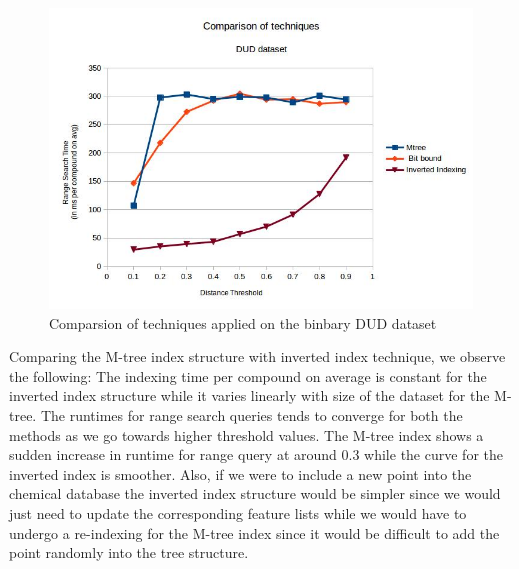 \begin{figure}[ht!]	
\centering
\includegraphics[width=0.75 \columnwidth]{img/imageC3.jpg}
\caption{Comparsion of techniques applied on the binbary DUD dataset}
\label{fig:5C3}
\end{figure}

Comparing the M-tree index structure with inverted index technique, we observe the following: The indexing time  per compound on average is constant for the inverted index structure while it varies linearly with size of the dataset for the M-tree. The runtimes for range search queries tends to converge for both the methods as we go towards higher threshold values. The M-tree index shows a sudden increase in runtime for range query at around 0.3 while the curve for the inverted index is smoother. Also, if we were to include a new point into the chemical database the inverted index structure would be simpler since we would just need to update the corresponding feature lists while we would have to undergo a re-indexing for the M-tree index since it would be difficult to add the point randomly into the tree structure.

